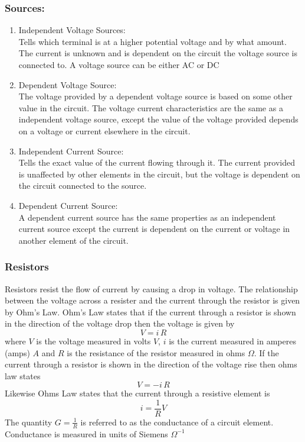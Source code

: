 \documentclass[14pt]{article}
\begin{document}
    \subsubsection{Sources:}
    \begin{enumerate}
        \item Independent Voltage Sources:\\
        Tells which terminal is at a higher potential voltage and by what amount. The current is unknown and is dependent on the circuit the voltage source is connected to. A voltage source can be either AC or DC
        \item Dependent Voltage Source:\\
        The voltage provided by a dependent voltage source is based on some other value in the circuit. The voltage current characteristics are the same as a independent voltage source, except the value of the voltage provided depends on a voltage or current elsewhere in the circuit. 
        \item Independent Current Source:\\
        Tells the exact value of the current flowing through it. The current provided is unaffected by other elements in the circuit, but the voltage is dependent on the circuit connected to the source.
        \item Dependent Current Source:\\
        A dependent current source has the same properties as an independent current source except the current is dependent on the current or voltage in another element of the circuit.
    \end{enumerate} 
    \subsubsection{Resistors}
    Resistors resist the flow of current by causing a drop in voltage. The relationship between the voltage across a resister and the current through the resistor is given by Ohm's Law. Ohm's Law states that if the current through a resistor is shown in the direction of the voltage drop then the voltage is given by $$V=i\,R$$ where $V$ is the voltage measured in volts $V$, $i$ is the current measured in amperes (amps) $A$ and $R$ is the resistance of the resistor measured in ohms $\Omega$. If the current through a resistor is shown in the direction of the voltage rise then ohms law states $$V=-i\,R$$
    Likewise Ohms Law states that the current through a resistive element is 
    $$i=\frac{1}{R}V$$
    The quantity $G=\frac{1}{R}$ is referred to as the conductance of a circuit element. Conductance is measured in units of Siemens $\Omega^{-1}$
\end{document}

